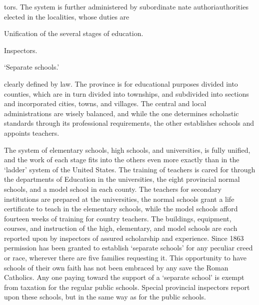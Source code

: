 \documentclass[
]{book}
\begin{document}
tors. The system is further administered by subordinate nate authoriauthorities elected in the localities, whose duties are

Unification of the several stages of education.

Inspectors.

`Separate schools.'

clearly defined by law. The province is for educational purposes divided into counties, which are in turn divided into townships, and subdivided into sections and incorporated cities, towns, and villages. The central and local administrations are wisely balanced, and while the one determines scholastic standards through its professional requirements, the other establishes schools and appoints teachers.

The system of elementary schools, high schools, and universities, is fully unified, and the work of each stage fits into the others even more exactly than in the `ladder' system of the United States. The training of teachers is cared for through the departments of Education in the universities, the eight provincial normal schools, and a model school in each county. The teachers for secondary institutions are prepared at the universities, the normal schools grant a life certificate to teach in the elementary schools, while the model schools afford fourteen weeks of training for country teachers. The buildings, equipment, courses, and instruction of the high, elementary, and model schools are each reported upon by inspectors of assured scholarship and experience. Since 1863 permission has been granted to establish `separate schools' for any peculiar creed or race, wherever there are five families requesting it. This opportunity to have schools of their own faith has not been embraced by any save the Roman Catholics. Any one paying toward the support of a `separate school' is exempt from taxation for the regular public schools. Special provincial inspectors report upon these schools, but in the same way as for the public schools.
\end{document}
